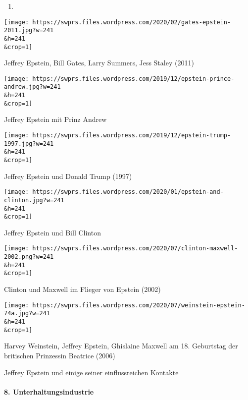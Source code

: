 \begin{enumerate}
\def\labelenumi{\arabic{enumi})}
\setcounter{enumi}{2019}
\item
\end{enumerate}

\href{https://swprs.org/geopolitik-und-paedokriminalitaet/gates-epstein-2011/}{}

\texttt{[image: https://swprs.files.wordpress.com/2020/02/gates-epstein-2011.jpg?w=241\\\&h=241\\\&crop=1]}

Jeffrey Epstein, Bill Gates, Larry Summers, Jess Staley (2011)

\href{https://swprs.org/geopolitik-und-paedokriminalitaet/epstein-prince-andrew/}{}

\texttt{[image: https://swprs.files.wordpress.com/2019/12/epstein-prince-andrew.jpg?w=241\\\&h=241\\\&crop=1]}

Jeffrey Epstein mit Prinz Andrew

\href{https://swprs.org/geopolitik-und-paedokriminalitaet/epstein-trump-1997/}{}

\texttt{[image: https://swprs.files.wordpress.com/2019/12/epstein-trump-1997.jpg?w=241\\\&h=241\\\&crop=1]}

Jeffrey Epstein und Donald Trump (1997)

\href{https://swprs.org/geopolitik-und-paedokriminalitaet/epstein-and-clinton/}{}

\texttt{[image: https://swprs.files.wordpress.com/2020/01/epstein-and-clinton.jpg?w=241\\\&h=241\\\&crop=1]}

Jeffrey Epstein und Bill Clinton

\href{https://swprs.org/geopolitik-und-paedokriminalitaet/clinton-maxwell-2002/}{}

\texttt{[image: https://swprs.files.wordpress.com/2020/07/clinton-maxwell-2002.png?w=241\\\&h=241\\\&crop=1]}

Clinton und Maxwell im Flieger von Epstein (2002)

\href{https://swprs.org/geopolitik-und-paedokriminalitaet/weinstein-epstein-74a/}{}

\texttt{[image: https://swprs.files.wordpress.com/2020/07/weinstein-epstein-74a.jpg?w=241\\\&h=241\\\&crop=1]}

Harvey Weinstein, Jeffrey Epstein, Ghislaine Maxwell am 18. Geburtstag
der britischen Prinzessin Beatrice (2006)

Jeffrey Epstein und einige seiner einflussreichen Kontakte

\hypertarget{8-unterhaltungsindustrie}{%
\paragraph{8. Unterhaltungsindustrie}\label{8-unterhaltungsindustrie}}

